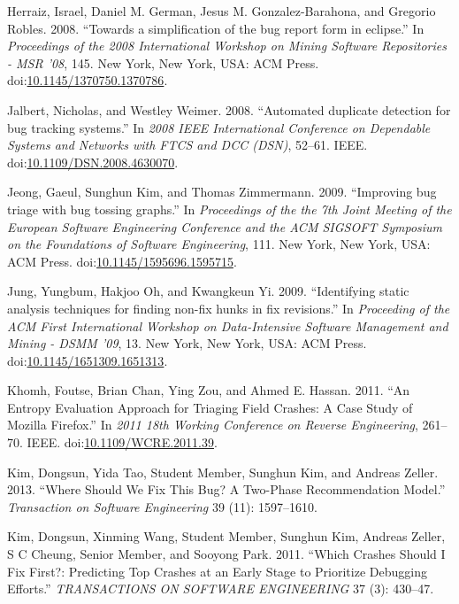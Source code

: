 \documentclass[natbib]{svjour3}
\begin{document}
\hypertarget{ref-Herraiz2008}{}
Herraiz, Israel, Daniel M. German, Jesus M. Gonzalez-Barahona, and
Gregorio Robles. 2008. ``Towards a simplification of the bug report form
in eclipse.'' In \emph{Proceedings of the 2008 International Workshop on
Mining Software Repositories - MSR '08}, 145. New York, New York, USA:
ACM Press.
doi:\href{https://doi.org/10.1145/1370750.1370786}{10.1145/1370750.1370786}.

\hypertarget{ref-Jalbert2008}{}
Jalbert, Nicholas, and Westley Weimer. 2008. ``Automated duplicate
detection for bug tracking systems.'' In \emph{2008 IEEE International
Conference on Dependable Systems and Networks with FTCS and DCC (DSN)},
52--61. IEEE.
doi:\href{https://doi.org/10.1109/DSN.2008.4630070}{10.1109/DSN.2008.4630070}.

\hypertarget{ref-Jeong2009}{}
Jeong, Gaeul, Sunghun Kim, and Thomas Zimmermann. 2009. ``Improving bug
triage with bug tossing graphs.'' In \emph{Proceedings of the the 7th
Joint Meeting of the European Software Engineering Conference and the
ACM SIGSOFT Symposium on the Foundations of Software Engineering}, 111.
New York, New York, USA: ACM Press.
doi:\href{https://doi.org/10.1145/1595696.1595715}{10.1145/1595696.1595715}.

\hypertarget{ref-Jung2009}{}
Jung, Yungbum, Hakjoo Oh, and Kwangkeun Yi. 2009. ``Identifying static
analysis techniques for finding non-fix hunks in fix revisions.'' In
\emph{Proceeding of the ACM First International Workshop on
Data-Intensive Software Management and Mining - DSMM '09}, 13. New York,
New York, USA: ACM Press.
doi:\href{https://doi.org/10.1145/1651309.1651313}{10.1145/1651309.1651313}.

\hypertarget{ref-Khomh2011a}{}
Khomh, Foutse, Brian Chan, Ying Zou, and Ahmed E. Hassan. 2011. ``An
Entropy Evaluation Approach for Triaging Field Crashes: A Case Study of
Mozilla Firefox.'' In \emph{2011 18th Working Conference on Reverse
Engineering}, 261--70. IEEE.
doi:\href{https://doi.org/10.1109/WCRE.2011.39}{10.1109/WCRE.2011.39}.

\hypertarget{ref-Kim2013a}{}
Kim, Dongsun, Yida Tao, Student Member, Sunghun Kim, and Andreas Zeller.
2013. ``Where Should We Fix This Bug? A Two-Phase Recommendation
Model.'' \emph{Transaction on Software Engineering} 39 (11): 1597--1610.

\hypertarget{ref-Kim2011c}{}
Kim, Dongsun, Xinming Wang, Student Member, Sunghun Kim, Andreas Zeller,
S C Cheung, Senior Member, and Sooyong Park. 2011. ``Which Crashes
Should I Fix First?: Predicting Top Crashes at an Early Stage to
Prioritize Debugging Efforts.'' \emph{TRANSACTIONS ON SOFTWARE
ENGINEERING} 37 (3): 430--47.
\end{document}
